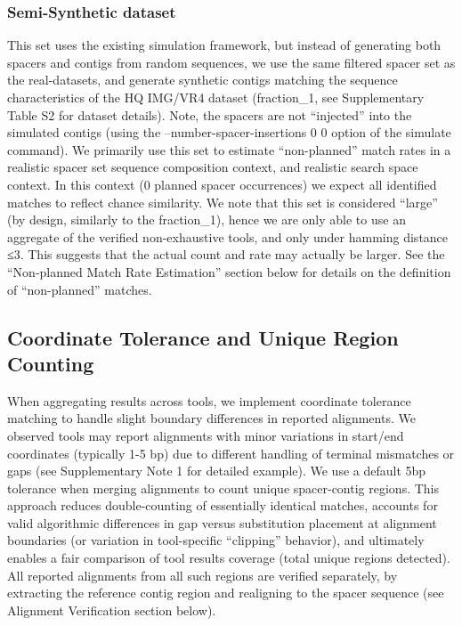 \documentclass[
]{article}
\begin{document}
\subsubsection{Semi-Synthetic dataset}\label{sec-semi-synthetic}

This set uses the existing simulation framework, but instead of
generating both spacers and contigs from random sequences, we use the
same filtered spacer set as the real-datasets, and generate synthetic
contigs matching the sequence characteristics of the HQ IMG/VR4 dataset
(fraction\_1, see Supplementary Table S2 for dataset details). Note, the
spacers are not ``injected'' into the simulated contigs (using the
--number-spacer-insertions 0 0 option of the simulate command). We
primarily use this set to estimate ``non-planned'' match rates in a
realistic spacer set sequence composition context, and realistic search
space context. In this context (0 planned spacer occurrences) we expect
all identified matches to reflect chance similarity. We note that this
set is considered ``large'' (by design, similarly to the fraction\_1),
hence we are only able to use an aggregate of the verified
non-exhaustive tools, and only under hamming distance ≤3. This suggests
that the actual count and rate may actually be larger. See the
``Non-planned Match Rate Estimation'' section below for details on the
definition of ``non-planned'' matches.

\subsection{Coordinate Tolerance and Unique Region
Counting}\label{sec-coordinate-tolerance}

When aggregating results across tools, we implement coordinate tolerance
matching to handle slight boundary differences in reported alignments.
We observed tools may report alignments with minor variations in
start/end coordinates (typically 1-5 bp) due to different handling of
terminal mismatches or gaps (see Supplementary Note 1 for detailed
example). We use a default 5bp tolerance when merging alignments to
count unique spacer-contig regions. This approach reduces
double-counting of essentially identical matches, accounts for valid
algorithmic differences in gap versus substitution placement at
alignment boundaries (or variation in tool-specific ``clipping''
behavior), and ultimately enables a fair comparison of tool results
coverage (total unique regions detected). All reported alignments from
all such regions are verified separately, by extracting the reference
contig region and realigning to the spacer sequence (see Alignment
Verification section below).
\end{document}
